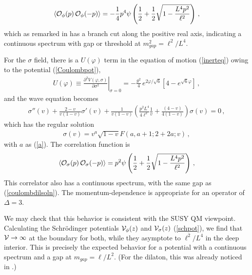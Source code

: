 \documentclass[a4paper,12pt]{article}
\begin{document}
\begin{eqnarray}
\label{coulombdilsoln}
\langle{\cal O}_{\phi}(p) \, {\cal O}_{\phi}(-p)\rangle = - \frac{1}{4} p^4 \psi \left( \frac{1}{2} +
\frac{1}{2}\sqrt{1 - \frac{L^4p^2}{\ell^2}} \right) \,,
\end{eqnarray}
which as remarked in \cite{fgpw2} has a branch cut along the positive
real axis, indicating a continuous spectrum with gap or threshold at 
$m_{gap}^2 =\ell^2/L^4$.

For the $\sigma$ field, there is a $U(\varphi)$ term in the equation
of motion (\ref{inerteq}) owing to the potential (\ref{Coulombpot}),
\begin{eqnarray}
U(\varphi) \equiv \left. \frac{\partial^2 V(\varphi,\sigma)}{\partial
\sigma^2} \right|_{\sigma = 0} = - \frac{g^2}{4} \, e^{2
\varphi/\sqrt{6}}  \left[4 - e^{\sqrt{6} \varphi} \right] \,,
\end{eqnarray}
and the wave equation becomes
\begin{eqnarray}
\sigma''(v) + \frac{2-v}{v(1-v)} \sigma'(v) + \frac{1}{v(1-v)} \left(  \frac{p^2 L^4}{4 \ell^2} \frac{1}{v} + \frac{(4-v)}{4(1-v)} \right) \sigma(v) = 0\,,
\end{eqnarray}
which has the regular solution
\begin{eqnarray}
\sigma(v) = v^a \sqrt{1-v} F(a,a+1;2+2a;v) \,,
\end{eqnarray}
with $a$ as (\ref{a}).  The correlation function is
\begin{eqnarray}
\langle {\cal O}_{\sigma}(p) \, {\cal O}_{\sigma}(-p) \rangle = p^2 \psi \left(
\frac{1}{2} + \frac{1}{2}\sqrt{1 - \frac{L^4p^2}{\ell^2}} \right) \,,
\end{eqnarray}
This correlator also has a continuous spectrum, with the same gap as
(\ref{coulombdilsoln}).  The momentum-dependence is appropriate for an operator
of $\Delta = 3$.

We may check that this behavior is consistent with the SUSY QM
viewpoint.  Calculating the Schr\"odinger potentials ${\cal
V}_{\phi}(z)$ and ${\cal V}_{\sigma}(z)$ (\ref{schpot}), we find that
${\cal V}\rightarrow \infty$ at the boundary for both, while they
asymptote to $\ell^2/L^4$ in the deep interior.  This is precisely the
expected behavior for a potential with a continuous spectrum and a gap
at $m_{gap} = \ell/L^2$.  (For the dilaton, this was already noticed
in \cite{fgpw2}.)
\end{document}
